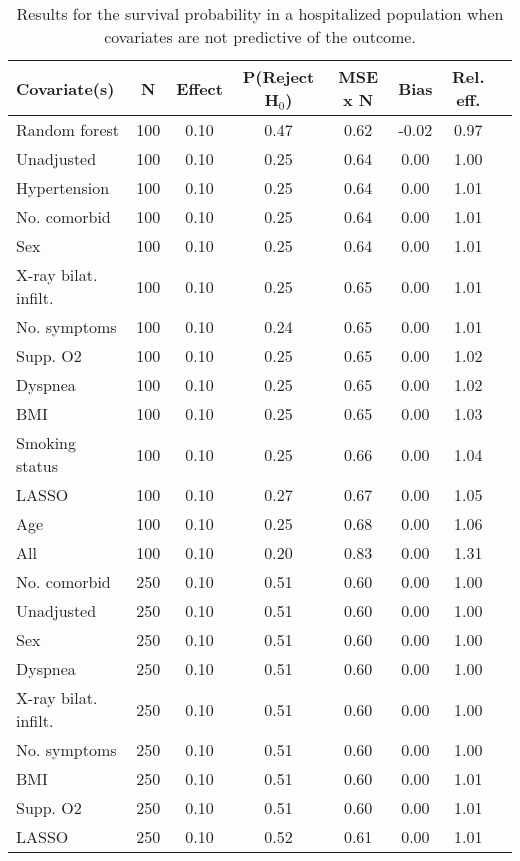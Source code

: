 \documentclass{article}
\begin{document}
\clearpage

{\tabcolsep=6pt  %
\begin{longtable}{lccccccc}
\caption{Results for the survival probability in a hospitalized population when covariates are not predictive of the outcome.} \\
Covariate(s) & N & Effect & P(Reject H$_0$) & MSE x N & Bias & Rel. eff.\\ \midrule
Random forest & 100 & 0.10 & 0.47 & 0.62 & -0.02 & 0.97 \\ 
Unadjusted & 100 & 0.10 & 0.25 & 0.64 &  0.00 & 1.00 \\ 
Hypertension & 100 & 0.10 & 0.25 & 0.64 &  0.00 & 1.01 \\ 
No. comorbid & 100 & 0.10 & 0.25 & 0.64 &  0.00 & 1.01 \\ 
Sex & 100 & 0.10 & 0.25 & 0.64 &  0.00 & 1.01 \\ 
X-ray bilat. infilt. & 100 & 0.10 & 0.25 & 0.65 &  0.00 & 1.01 \\ 
No. symptoms & 100 & 0.10 & 0.24 & 0.65 &  0.00 & 1.01 \\ 
Supp. O2 & 100 & 0.10 & 0.25 & 0.65 &  0.00 & 1.02 \\ 
Dyspnea & 100 & 0.10 & 0.25 & 0.65 &  0.00 & 1.02 \\ 
BMI & 100 & 0.10 & 0.25 & 0.65 &  0.00 & 1.03 \\ 
Smoking status & 100 & 0.10 & 0.25 & 0.66 &  0.00 & 1.04 \\ 
LASSO & 100 & 0.10 & 0.27 & 0.67 &  0.00 & 1.05 \\ 
Age & 100 & 0.10 & 0.25 & 0.68 &  0.00 & 1.06 \\ 
All & 100 & 0.10 & 0.20 & 0.83 &  0.00 & 1.31 \\ \midrule() 
No. comorbid & 250 & 0.10 & 0.51 & 0.60 &  0.00 & 1.00 \\ 
Unadjusted & 250 & 0.10 & 0.51 & 0.60 &  0.00 & 1.00 \\ 
Sex & 250 & 0.10 & 0.51 & 0.60 &  0.00 & 1.00 \\ 
Dyspnea & 250 & 0.10 & 0.51 & 0.60 &  0.00 & 1.00 \\ 
X-ray bilat. infilt. & 250 & 0.10 & 0.51 & 0.60 &  0.00 & 1.00 \\ 
No. symptoms & 250 & 0.10 & 0.51 & 0.60 &  0.00 & 1.00 \\ 
BMI & 250 & 0.10 & 0.51 & 0.60 &  0.00 & 1.01 \\ 
Supp. O2 & 250 & 0.10 & 0.51 & 0.60 &  0.00 & 1.01 \\ 
LASSO & 250 & 0.10 & 0.52 & 0.61 &  0.00 & 1.01 \\ 

\end{longtable}}
\end{document}
